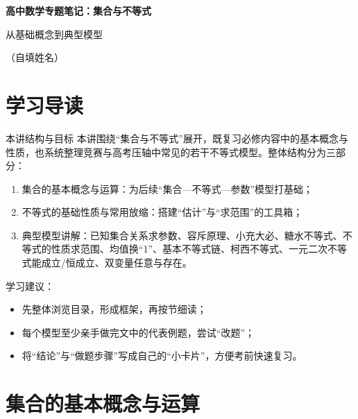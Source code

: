 \documentclass[a4paper,11pt]{ctexart}
\renewcommand{\notetitle}{高中数学专题笔记：集合与不等式}
\renewcommand{\notesubtitle}{从基础概念到典型模型}
\renewcommand{\noteauthor}{（自填姓名）}
\begin{document}
\fi

\thispagestyle{empty}
\setcounter{page}{1}

\noindent
\begin{minipage}[t][0.7\textheight][c]{\textwidth}
  \raggedleft
  \vspace*{\fill}
  {\sffamily\bfseries\Huge\color{accent}\notetitle\par}
  \vspace{0.6em}
  {\Large\color{inkgray}\notesubtitle\par}
  \vspace{0.5em}
  {\large\color{inkgray}\noteauthor\par}
  \vspace{0.4em}
  \MathNoteVersionBlock
  \vspace*{\fill}
\end{minipage}

\ifdefined\MathNoteBookMode\else
\clearpage
\thispagestyle{plain}
\tableofcontents
\newpage
\fi

\section{学习导读}

\begin{summarybox}{本讲结构与目标}
本讲围绕“集合与不等式”展开，既复习必修内容中的基本概念与性质，也系统整理竞赛与高考压轴中常见的若干不等式模型。整体结构分为三部分：
\begin{enumerate}
  \item 集合的基本概念与运算：为后续“集合—不等式—参数”模型打基础；
  \item 不等式的基础性质与常用放缩：搭建“估计”与“求范围”的工具箱；
  \item 典型模型讲解：已知集合关系求参数、容斥原理、小充大必、糖水不等式、不等式的性质求范围、均值换“1”、基本不等式链、柯西不等式、一元二次不等式能成立/恒成立、双变量任意与存在。
\end{enumerate}
学习建议：
\begin{itemize}
  \item 先整体浏览目录，形成框架，再按节细读；
  \item 每个模型至少亲手做完文中的代表例题，尝试“改题”；
  \item 将“结论”与“做题步骤”写成自己的“小卡片”，方便考前快速复习。
\end{itemize}
\end{summarybox}

\section{集合的基本概念与运算}
\end{document}
